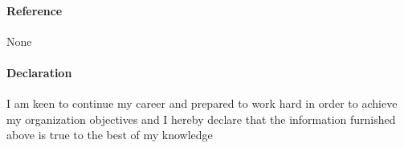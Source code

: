 \documentclass{article}
\begin{document}
\paragraph{\textbf{Reference}}
None
\paragraph{\textbf{Declaration}}
I am keen to continue my career and prepared to work hard in order to achieve my organization objectives and I hereby declare that the information furnished above is true to the best of my knowledge
\end{document}
